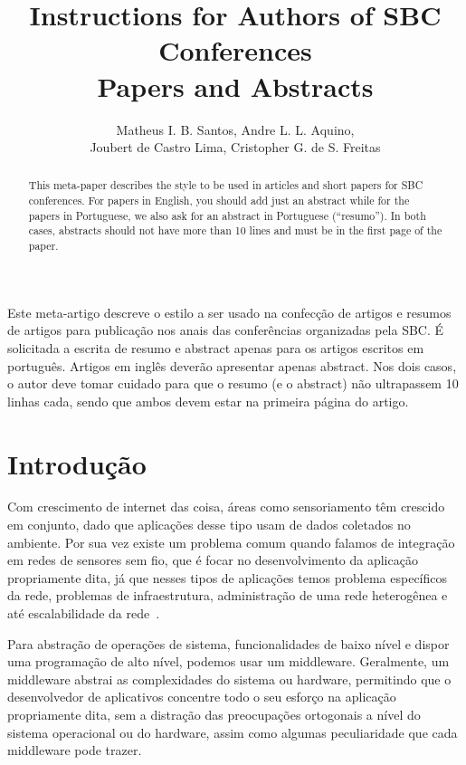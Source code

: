 \documentclass[12pt]{article}
\title{Instructions for Authors of SBC Conferences\\ Papers and Abstracts}
\author{Matheus I. B. Santos\inst{1}, Andre L. L. Aquino\inst{2}, \\ Joubert de Castro Lima\inst{2}, Cristopher G. de S. Freitas\inst{2}}
\begin{document}
 

\maketitle

\begin{abstract}
  This meta-paper describes the style to be used in articles and short papers
  for SBC conferences. For papers in English, you should add just an abstract
  while for the papers in Portuguese, we also ask for an abstract in
  Portuguese (``resumo''). In both cases, abstracts should not have more than
  10 lines and must be in the first page of the paper.
\end{abstract}
     
\begin{resumo} 
  Este meta-artigo descreve o estilo a ser usado na confecção de artigos e
  resumos de artigos para publicação nos anais das conferências organizadas
  pela SBC. É solicitada a escrita de resumo e abstract apenas para os artigos
  escritos em português. Artigos em inglês deverão apresentar apenas abstract.
  Nos dois casos, o autor deve tomar cuidado para que o resumo (e o abstract)
  não ultrapassem 10 linhas cada, sendo que ambos devem estar na primeira
  página do artigo.
\end{resumo}


\section{Introdução}\label{intro}

Com crescimento de internet das coisa, áreas como sensoriamento têm crescido em conjunto, dado que aplicações desse tipo usam de dados coletados no ambiente. Por sua vez existe um problema comum quando falamos de integração em redes de sensores sem fio, que é focar no desenvolvimento da aplicação propriamente dita, já que nesses tipos de aplicações temos problema específicos da rede, problemas de infraestrutura, administração de uma rede heterogênea e até escalabilidade da rede~\cite{Heinzelman2004}.

Para abstração de operações de sistema, funcionalidades de baixo nível e dispor uma programação de alto nível, podemos usar um middleware. Geralmente, um middleware abstrai as complexidades do sistema ou hardware, permitindo que o desenvolvedor de aplicativos concentre todo o seu esforço na aplicação propriamente dita, sem a distração das preocupações ortogonais a nível do sistema operacional ou do hardware, assim como algumas peculiaridade que cada middleware pode trazer.
\end{document}
